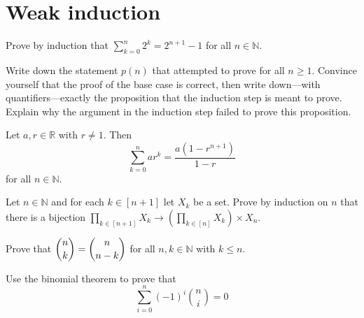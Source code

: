 \section{Weak induction}


\begin{exercise}
\label{exSumOfPowersOf2}
Prove by induction that $\displaystyle \sum_{k=0}^n 2^k = 2^{n+1} - 1$ for all $n \in \mathbb{N}$.
\end{exercise}


\begin{exercise}
Write down the statement $p(n)$ that  attempted to prove for all $n \ge 1$. Convince yourself that the proof of the base case is correct, then write down---with quantifiers---exactly the proposition that the induction step is meant to prove. Explain why the argument in the induction step failed to prove this proposition.
\end{exercise}

\begin{exercise}
\label{exFormulaForGeometricProgression}
Let $a,r \in \mathbb{R}$ with $r \ne 1$. Then
\[ \sum_{k=0}^n ar^k = \frac{a(1-r^{n+1})}{1-r} \]
for all $n \in \mathbb{N}$.
\end{exercise}

\begin{exercise}
Let $n \in \mathbb{N}$ and for each $k \in [n+1]$ let $X_k$ be a set. Prove by induction on $n$ that there is a bijection $\displaystyle \prod_{k \in [n+1]} X_k \to \left( \prod_{k \in [n]} X_k \right) \times X_n$.
\end{exercise}

\begin{exercise}
Prove that $\dbinom{n}{k} = \dbinom{n}{n-k}$ for all $n,k \in \mathbb{N}$ with $k \le n$.
\end{exercise}


\begin{exercise}
Use the binomial theorem to prove that
\[ \sum_{i=0}^n (-1)^i \binom{n}{i} = 0 \]
\end{exercise}

